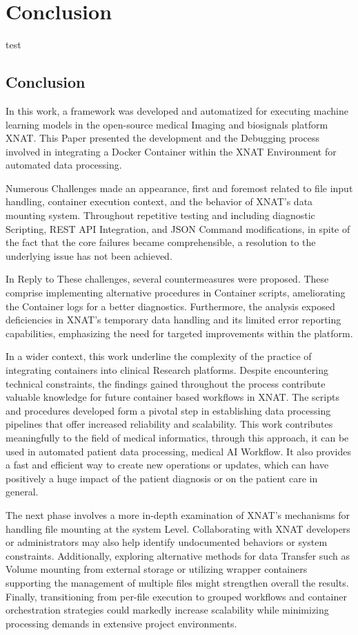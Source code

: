 

\chapter{Conclusion}

test
\section{Conclusion}
In this work, a framework was developed and automatized for executing machine learning models in the open-source medical Imaging and biosignals platform XNAT. This Paper presented the development and the Debugging process involved in integrating a Docker Container within the XNAT Environment for automated data processing.

Numerous Challenges made an appearance, first and foremost related to file input handling, container execution context, and the behavior of XNAT's data mounting system. Throughout repetitive testing and including diagnostic Scripting, REST API Integration, and JSON Command modifications, in spite of the fact that the core failures became comprehensible, a resolution to the underlying issue has not been achieved.


In Reply to These challenges, several countermeasures were proposed. These comprise implementing alternative procedures in Container scripts, ameliorating the Container logs for a better diagnostics. Furthermore, the analysis exposed deficiencies in XNAT’s temporary data handling and its limited error reporting capabilities, emphasizing the need for targeted improvements within the platform.

In a wider context, this work underline the complexity of the practice of integrating containers into clinical Research platforms.
Despite encountering technical constraints, the findings gained throughout the process
contribute valuable knowledge for future container based workflows in XNAT. The scripts and procedures developed form a pivotal step in establishing data processing pipelines that offer increased reliability and scalability. This work contributes meaningfully to the field of medical informatics, through this approach, it can be used in automated patient data processing, medical AI Workflow. It also provides a fast and efficient way to create new operations or updates, which can have positively a huge impact of the patient diagnosis or on the patient care in general.

The next phase involves a more in-depth examination of XNAT's mechanisms for handling file mounting at the system Level. Collaborating with XNAT developers or administrators may also help identify undocumented behaviors or system constraints. Additionally, exploring alternative methods for data Transfer such as Volume mounting from external storage or utilizing wrapper containers supporting the management of multiple files  might strengthen overall the results. Finally, transitioning from per-file execution to grouped workflows and container orchestration strategies could markedly increase scalability while minimizing processing demands in extensive project environments.


